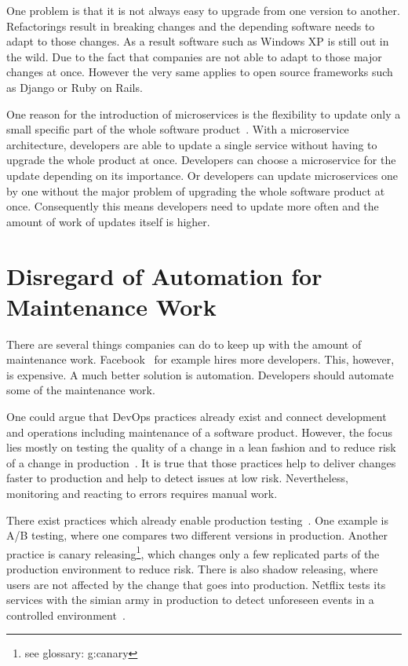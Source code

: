 One problem is that it is not always easy to upgrade from one version to
another. Refactorings result in breaking changes and the depending software needs to adapt
to those changes. As a result software such as Windows XP is still out in the wild. Due to
the fact that companies are not able to adapt to those major changes at once. However the
very same applies to open source frameworks such as Django or Ruby on Rails.

One reason for the introduction of microservices is the flexibility to update only a small
specific part of the whole software product~\cite{microservices_fowler}. With a
microservice architecture, developers are able to update a single service without having
to upgrade the whole product at once. Developers can choose a microservice for the update
depending on its importance. Or developers can update microservices one by one without the
major problem of upgrading the whole software product at once. Consequently this means
developers need to update more often and the amount of work of updates itself is higher.

\section{Disregard of Automation for Maintenance Work}

There are several things companies can do to keep up with the amount of maintenance
work. Facebook~\cite{dev_at_fb} for example hires more developers. This, however, is
expensive. A much better solution is automation. Developers should automate some of the
maintenance work.

One could argue that DevOps practices already exist and connect development and operations
including maintenance of a software product. However, the focus lies mostly on testing the
quality of a change in a lean fashion and to reduce risk of a change in
production~\cite{devops_definition}. It is true that those practices help to deliver
changes faster to production and help to detect issues at low risk. Nevertheless,
monitoring and reacting to errors requires manual work.

There exist practices which already enable production testing~\cite{dev_at_fb}. One
example is A/B testing, where one compares two different versions in production. Another
practice is canary releasing\footnote{see glossary: \gls{g:canary}}, which changes only a few
replicated parts of the production environment to reduce risk. There is also shadow
releasing, where users are not affected by the change that goes into production. Netflix
tests its services with the simian army in production to detect unforeseen events in a
controlled environment~\cite{antifragile_org}.

